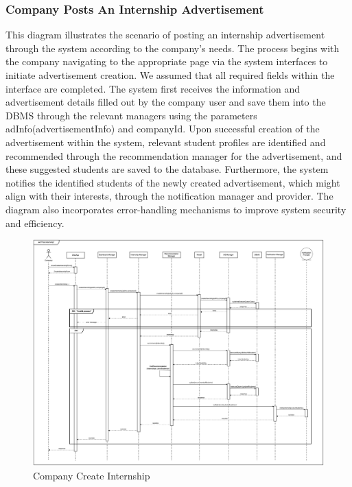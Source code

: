 \documentclass[a4paper,12pt]{article}
\begin{document}
\subsubsection*{ Company Posts An Internship Advertisement}  
This diagram illustrates the scenario of posting an internship advertisement through the system according to the company's needs. The process begins with the company navigating to the appropriate page via the system interfaces to initiate advertisement creation. We assumed that all required fields within the interface are completed. The system first receives the information and advertisement details filled out by the company user and save them into the DBMS through the relevant managers using the parameters adInfo(advertisementInfo) and companyId. Upon successful creation of the advertisement within the system, relevant student profiles are identified and recommended through the recommendation manager for the advertisement, and these suggested students are saved to the database. Furthermore, the system notifies the identified students of the newly created advertisement, which might align with their interests, through the notification manager and provider. The diagram also incorporates error-handling mechanisms to improve system security and efficiency.

\begin{figure}[H]
    \centering
    \includegraphics[scale = 0.25]{DD_figures/SingleDiagrams/postInternship.drawio.png}
    \caption{Company Create Internship}
    \centering
\end{figure}
\newpage
\end{document}
